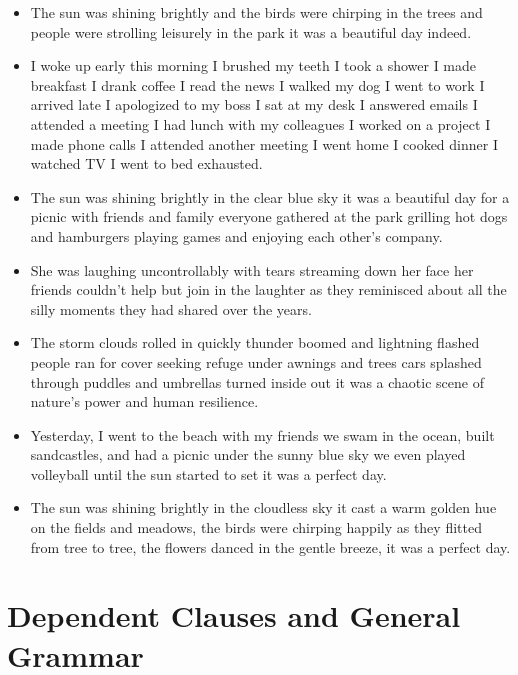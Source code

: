 \documentclass[letterpaper, 17pt]{article}
\begin{document}
\begin{itemize}
	\item The sun was shining brightly and the birds were chirping in the trees and people were strolling leisurely in the park it was a beautiful day indeed.	%

	\item I woke up early this morning I brushed my teeth I took a shower I made breakfast I drank coffee I read the news I walked my dog I went to work I arrived late I apologized to my boss I sat at my desk I answered emails I attended a meeting I had lunch with my colleagues I worked on a project I made phone calls I attended another meeting I went home I cooked dinner I watched TV I went to bed exhausted.	%

	\item The sun was shining brightly in the clear blue sky it was a beautiful day for a picnic with friends and family everyone gathered at the park grilling hot dogs and hamburgers playing games and enjoying each other's company.	%

	\item She was laughing uncontrollably with tears streaming down her face her friends couldn't help but join in the laughter as they reminisced about all the silly moments they had shared over the years.	%

	\item The storm clouds rolled in quickly thunder boomed and lightning flashed people ran for cover seeking refuge under awnings and trees cars splashed through puddles and umbrellas turned inside out it was a chaotic scene of nature's power and human resilience.	%

	\item Yesterday, I went to the beach with my friends we swam in the ocean, built sandcastles, and had a picnic under the sunny blue sky we even played volleyball until the sun started to set it was a perfect day.	%

	\item The sun was shining brightly in the cloudless sky it cast a warm golden hue on the fields and meadows, the birds were chirping happily as they flitted from tree to tree, the flowers danced in the gentle breeze, it was a perfect day.	%
\end{itemize}

\newpage
\section*{Dependent Clauses and General Grammar}
\end{document}
